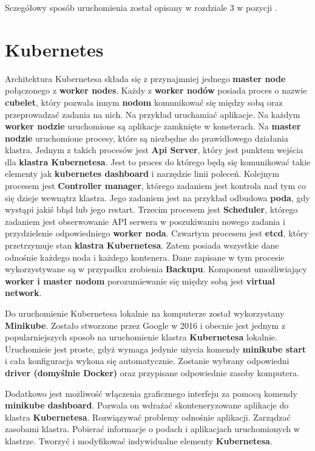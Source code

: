 \documentclass{iiuwb}
\begin{document}
Sczegółowy sposób uruchomienia został opisany w rozdziale 3 
w pozycji \cite{DockerSwarm}.

\section{Kubernetes}
\label{sec: Kubernetes}

Architektura Kubernetesa składa się z przynajmniej 
jednego \textbf{master node} połączonego z \textbf{worker
nodes}. Każdy z \textbf{worker nodów} posiada proces 
o nazwie \textbf{cubelet}, który pozwala innym \textbf{nodom}
komunikować się między sobą oraz przeprowadzać zadania na nich.
Na przykład uruchamiać aplikacje. Na każdym \textbf{worker
nodzie} uruchomione są aplikacje zamknięte w koneterach. 
Na \textbf{master nodzie} uruchomione procesy, które są
niezbędne do prawidłowego działania klastra. Jednym z takich
procesów jest \textbf{Api Server}, który jest punktem wejścia
dla \textbf{klastra Kubernetesa}. Jest to proces do którego 
będą się komunikować takie elementy jak \textbf{kubernetes 
dashboard} i narzędzie linii poleceń. Kolejnym procesem jest
\textbf{Controller manager}, którego zadaniem jest kontrola 
nad tym co się dzieje wewnątrz klastra. Jego zadaniem jest
na przykład odbudowa \textbf{poda}, gdy wystąpi jakiś błąd lub
jego restart. Trzecim procesem jest \textbf{Scheduler}, którego
zadaniem jest obserwowanie API serwera w poszukiwaniu nowego
zadania i przydzielenie odpowiedniego \textbf{worker noda}.
Czwartym procesem jest \textbf{etcd}, który przetrzymuje stan
\textbf{klastra Kubernetesa}. Zatem posiada wszystkie dane 
odnośnie każdego noda i każdego kontenera. Dane zapisane w tym
procesie wykorzystywane są w przypadku zrobienia 
\textbf{Backupu}. Komponent umożliwiający \textbf{worker i master 
nodom} porozumiewanie się między sobą jest \textbf{virtual network}.

Do uruchomienie Kubernetesa lokalnie na komputerze został 
wykorzystany \textbf{Minikube}. Zostało stworzone przez
Google w 2016 i obecnie jest jednym z popularniejszych 
sposob na uruchomienie klastra \textbf{Kubernetesa} 
lokalnie. Uruchomieie jest proste, gdyż wymaga jedynie 
użycia komendy \textbf{minikube start} i cała konfiguracja
wykona się automatycznie. Zostanie wybrany odpowiedni 
\textbf{driver (domyślnie Docker)} oraz przypisane 
odpowiednie zasoby komputera. 

Dodatkowo jest możliwość włączenia graficznego interfeju
za pomocą komendy \textbf{minikube dashboard}. Pozwala on 
wdrażać skonteneryzowane aplikacje do klastra 
\textbf{Kubernetesa}. Rozwiązywać problemy odnośnie 
aplikacji. Zarządzać zasobami klastra. Pobierać informacje 
o podach i aplikacjach uruchomionych w klastrze. Tworzyć 
i modyfikować indywidualne elementy \textbf{Kubernetesa}.
\end{document}
